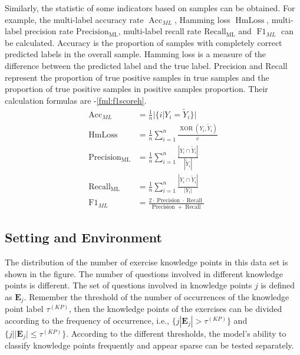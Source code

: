 Similarly, the statistic of some indicators based on samples can be obtained. For example, the multi-label accuracy rate \(\operatorname{Acc}_{ML}\), Hamming loss \(\operatorname{HmLoss}\), multi-label precision rate \(\operatorname{Precision_{ML}}\), multi-label recall rate \(\operatorname{Recall_{ML}}\) and \(\operatorname{F1}_{ML}\) can be calculated. Accuracy is the proportion of samples with completely correct predicted labels in the overall sample. Hamming loss is a measure of the difference between the predicted label and the true label. Precision and Recall represent the proportion of true positive samples in true samples and the proportion of true positive samples in positive samples proportion. Their calculation formulas are \eqname{\ref{fml:subaccuracy}}-{\ref{fml:f1scoreh}}.
\begin{align}
    \operatorname{Acc}_{ML}       & =\frac{1}{n} |\{i|Y_i=\tilde{Y}_i\}| \label{fml:subaccuracy}                                                                              \\
    \operatorname{HmLoss}         & =\frac{1}{n} \sum_{i=1}^{n} \frac{\operatorname{XOR}(Y_i,\tilde{Y}_i)}{c} \label{fml:hmloss}                                              \\
    \operatorname{Precision_{ML}} & =\frac{1}{n} \sum_{i=1}^{n} \frac{|Y_{i} \cap \tilde{Y}_i|}{|\tilde{Y}_i|} \label{fml:Precisionh}                                         \\
    \operatorname{Recall_{ML}}    & =\frac{1}{n} \sum_{i=1}^{n} \frac{|Y_{i} \cap \tilde{Y}_i|}{|Y_{i}|}    \label{fml:Recallh}                                               \\
    \operatorname{F1}_{ML}        & =\frac{2 \cdot \operatorname{Precision} \cdot \operatorname{Recall}}{\operatorname{Precision}+\operatorname{Recall}} \label{fml:f1scoreh}
\end{align}

\subsection{Setting and Environment}
The distribution of the number of exercise knowledge points in this data set is shown in the figure. The number of questions involved in different knowledge points is different. The set of questions involved in knowledge points \(j\) is defined as \(\mathbf{E}_j\). Remember the threshold of the number of occurrences of the knowledge point label \(\tau^{(KP)} \), then the knowledge points of the exercises can be divided according to the frequency of occurrence, i.e., \( \{j|\mathbf{E}_j|>\tau^{(KP)}\} \) and \( \{j||\mathbf{E}_j|\leq\tau^{(KP)} \} \). According to the different thresholds, the model's ability to classify knowledge points frequently and appear sparse can be tested separately.


